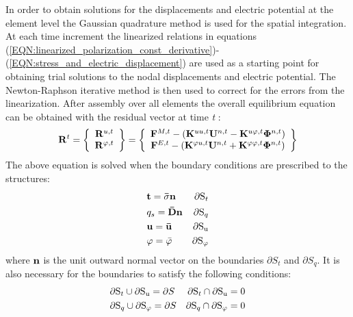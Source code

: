 In order to obtain solutions for the displacements and electric potential at the element level the Gaussian quadrature method is used for the spatial integration. 
At each time increment the linearized relations in equations (\ref{EQN:linearized_polarization_const_derivative})-(\ref{EQN:stress_and_electric_displacement}) are used as a starting point for obtaining trial solutions to the nodal displacements and electric potential. 
The Newton-Raphson iterative method is then used to correct for the errors from the linearization. 
After assembly over all elements the overall equilibrium equation can be obtained with the residual vector at time \textit{t} :
\begin{equation}  
{{\bf{R}}^t} = \left\{ {\begin{array}{*{20}{c}}
{{{\bf{R}}^{u,t}}}\\
{{{\bf{R}}^{\varphi ,t}}}
\end{array}} \right\} = \left\{ {\begin{array}{*{20}{c}}
{{{\bf{F}}^{M,t}} - \left( {{{\bf{K}}^{uu,t}}{{\bf{U}}^{n,t}} - {{\bf{K}}^{u\varphi ,t}}{{\bf{\Phi }}^{n,t}}} \right)}\\
{{{\bf{F}}^{E,t}} - \left( {{{\bf{K}}^{\varphi u,t}}{{\bf{U}}^{n,t}} + {{\bf{K}}^{\varphi \varphi ,t}}{{\bf{\Phi }}^{n,t}}} \right)}
\end{array}} \right\}
\label{EQN:residual_equation}
\end{equation}
The above equation is solved when the boundary conditions are prescribed to the structures:
\begin{equation}  
\begin{aligned}
&{\bf{t}} = {\bf{\bar \sigma n}} &  \partial {{\rm{S}}_t}\\
&{q_s} = {\bf{\bar Dn}} & \partial {{\rm{S}}_q}\\
&{\bf{u}} = {\bf{\bar u}} &  \partial {{\rm{S}}_{\rm{u}}}\\
&\varphi  = \bar \varphi  &  \partial {{\rm{S}}_\varphi }
\end{aligned}
\label{EQN:boundary_equation}
\end{equation}
where $\textbf n $ is  the unit outward normal vector on the boundaries $\partial {S_t}$ and $\partial {S_q}$. 
It is also necessary for the boundaries to satisfy the following conditions:
\begin{equation}  
\begin{aligned}
& \partial {{\rm{S}}_t} \cup \partial {{\rm{S}}_{\rm{u}}} = \partial S & \partial {{\rm{S}}_t} \cap \partial {{\rm{S}}_{\rm{u}}} = 0 \\
& \partial {{\rm{S}}_q} \cup \partial {{\rm{S}}_\varphi } = \partial S & \partial {{\rm{S}}_q} \cap \partial {{\rm{S}}_\varphi } = 0
\end{aligned}
\label{EQN:residual_equation_2}
\end{equation}
